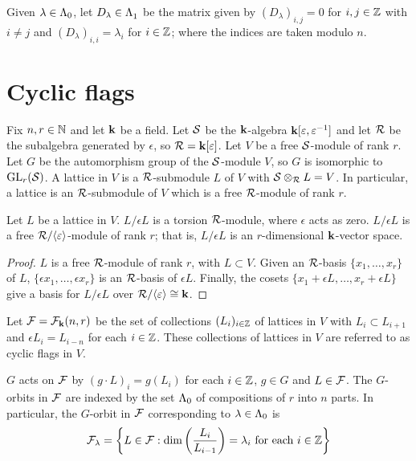 \documentclass[a4paper, 11pt]{report}
\begin{document}
\begin{definition}\label{def:diagonal-matrices}
Given $\lambda\in{\Lambda_0}$, let $D_\lambda\in\Lambda_1^{}$ be the matrix given by $(D_\lambda)_{i,j}=0$ for $i,j\in\mathbb{Z}$ with $i\neq j$ and $(D_\lambda)_{i,i}=\lambda_i$ for $i\in\mathbb{Z}$; where the indices are taken modulo $n$.
\end{definition}

\section{Cyclic flags}

Fix $n,r\in\mathbb{N}$ and let $\mathbf{k}$ be a field. Let $\mathcal{S}$ be the $\mathbf{k}$-algebra $\mathbf{k}[\varepsilon,\varepsilon^{-1}]$ and let $\mathcal{R}$ be the subalgebra generated by $\epsilon$, so $\mathcal{R} = \mathbf{k}[\varepsilon]$. Let $V$ be a free $\mathcal{S}$-module of rank $r$. Let $G$ be the automorphism group of the $\mathcal{S}$-module $V$, so $G$ is isomorphic to $\operatorname{GL}_{r}(\mathcal{S})$. A lattice in $V$ is a $\mathcal{R}$-submodule $L$ of $V$ with $\mathcal{S}\otimes_{\mathcal{R}} L = V$. In particular, a lattice is an $\mathcal{R}$-submodule of $V$ which is a free $\mathcal{R}$-module of rank $r$.

\begin{lemma}
Let $L$ be a lattice in $V$. $L/{\epsilon L}$ is a torsion $\mathcal{R}$-module, where $\epsilon$ acts as zero. $L/{\epsilon L}$ is a free $\mathcal{R}/{\langle \varepsilon \rangle}$-module of rank $r$; that is, $L/{\epsilon L}$ is an $r$-dimensional $\mathbf{k}$-vector space.
\end{lemma}
\begin{proof}
$L$ is a free $\mathcal{R}$-module of rank $r$, with $L\subset V$. Given an $\mathcal{R}$-basis $\{x_1,\ldots,x_r\}$ of $L$, $\{\epsilon x_1,\ldots, \epsilon x_r\}$ is an $\mathcal{R}$-basis of $\epsilon L$. Finally, the cosets $\{ x_1 + \epsilon L,\ldots, x_r + \epsilon L\}$ give a basis for $L/{\epsilon L}$ over $\mathcal{R}/{\langle \varepsilon\rangle}\cong \mathbf{k}$.
\end{proof}

Let $\mathcal{F}=\mathcal{F}_{\mathbf{k}}(n,r)$ be the set of collections $(L_i)_{i\in\mathbb{Z}}$ of lattices in $V$ with $L_i\subset L_{i+1}$ and $\epsilon L_i = L_{i-n}$ for each $i\in\mathbb{Z}$. These collections of lattices in $V$ are referred to as cyclic flags in $V$. 

$G$ acts on $\mathcal{F}$ by $(g\cdot L)_i = g(L_i)$ for each $i\in\mathbb{Z}$, $g\in G$ and $L\in\mathcal{F}$. The $G$-orbits in $\mathcal{F}$ are indexed by the set ${\Lambda_0}$ of compositions of $r$ into $n$ parts. In particular, the $G$-orbit in $\mathcal{F}$ corresponding to $\lambda\in{\Lambda_0}$ is
\begin{equation*}
\mathcal{F}_\lambda = \left\{L\in\mathcal{F}: \dim\left(\frac{L_i}{L_{i-1}}\right) = \lambda_i \text{ for each } i\in\mathbb{Z}\right\}
\end{equation*}
\end{document}

